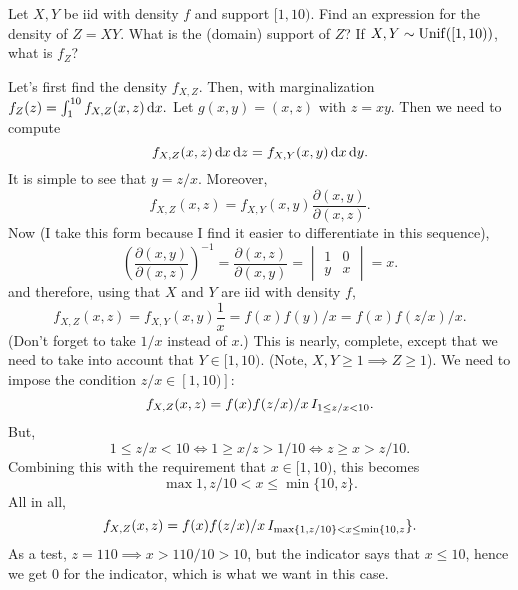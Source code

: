 \begin{exercise}
Let $X,Y$ be iid with density $f$ and support $[1,10)$. Find an expression for the density of $Z=XY$. What is the (domain) support of $Z$? If $X,Y\sim\mathrm{Unif}([1,10))$, what is $f_{Z}$?
\begin{solution}
Let's first find the density $f_{X,Z}$. Then, with marginalization $f_{Z}(z) = \int_{1}^{10} f_{X,Z}(x,z) \,\textrm{d}x.$
Let $g(x,y) = (x, z)$ with $z=xy$. Then we need to compute
\begin{equation}
\label{eq:20}
f_{X,Z}(x,z) \,\textrm{d}x \,\textrm{d}z =
f_{X,Y}(x,y) \,\textrm{d}x \,\textrm{d}y.
\end{equation}
It is simple to see that $y=z/x$. Moreover,
\begin{equation}
f_{X,Z}(x,z)  = f_{X,Y}(x,y) \frac{\partial(x,y)}{\partial(x, z)}.
\end{equation}
Now (I take this form because I find it easier to differentiate in this sequence),
\begin{equation}
\label{eq:19}
\left(\frac{\partial(x,y)}{\partial(x,z)}\right)^{-1} =
\frac{\partial(x,z)}{\partial(x,y)} =
\begin{vmatrix}
  1 & 0 \\
y & x
\end{vmatrix} = x.
\end{equation}
and therefore, using that $X$ and $Y$ are iid with density $f$,
\begin{equation}
f_{X,Z}(x,z)  = f_{X,Y}(x,y) \frac{1}{x} = f(x)f(y)/x = f(x)f(z/x)/ x.
\end{equation}
(Don't forget to take $1/x$ instead of $x$.)
This is nearly, complete, except that we need to take into account that $Y\in [1,10)$.
(Note, $X,Y\geq 1 \implies Z\geq 1$).
We need to impose the condition $z/x \in [1, 10)]$:
\begin{equation}
f_{X,Z}(x,z)  = f(x)f(z/x)/ x \,I_{1\leq z/x <10}.
\end{equation}
But,
\begin{equation}
\label{eq:22}
1\leq z/x < 10 \iff 1 \geq x/z > 1/10 \iff z \geq x > z/10.
\end{equation}
Combining this with the requirement that $x\in [1, 10)$,  this becomes
\begin{equation}
\max{1, z/10} < x \leq \min\{10, z\}.
\end{equation}
All in all,
\begin{equation}
f_{X,Z}(x,z)  = f(x)f(z/x)/ x \,I_{\max\{1, z/10\}< x \leq \min\{10, z}\}.
\end{equation}
As a test, $z=110 \implies x > 110/10 > 10$, but the indicator says that $x\leq 10$, hence we get 0 for the indicator, which is what we want in this case.



\end{solution}
\end{exercise}
